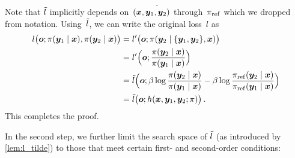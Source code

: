 \begin{proofEnd}
\begin{proofEnd}
\begin{equation*}
            \,.
        \end{equation*}
        Note that ${\tilde{l}}$ implicitly depends on~$({\bm{x}}, {\bm{y}}_1, {\bm{y}}_2)$ through~$\pi_{\rm ref}$ which we dropped from notation. Using~${\tilde{l}}$, we can write the original loss~$l$ as
        \begin{align*}
            l\big({\bm{o}}; \pi({\bm{y}}_1 \mid {\bm{x}}), \pi({\bm{y}}_2 \mid {\bm{x}})\big) &= 
            l'\big({\bm{o}}; \pi({\bm{y}}_2 \mid \{{\bm{y}}_1, {\bm{y}}_2\}, {\bm{x}})\big) \\
            &= l'\Big({\bm{o}}; \frac{\pi({\bm{y}}_2 \mid {\bm{x}})}{\pi({\bm{y}}_1 \mid {\bm{x}})}\Big) \\
            &= {\tilde{l}}\Big({\bm{o}}; \beta \log \frac{\pi({\bm{y}}_2 \mid {\bm{x}})}{\pi({\bm{y}}_1 \mid {\bm{x}})} - \beta \log \frac{\pi_{\rm ref}({\bm{y}}_2 \mid {\bm{x}})}{\pi_{\rm ref}({\bm{y}}_1 \mid {\bm{x}})} \Big) \\
            &= {\tilde{l}}\big({\bm{o}}; h({\bm{x}}, {\bm{y}}_1, {\bm{y}}_2; \pi)\big)
            \,.
        \end{align*}
        This completes the proof.
    \end{proofEnd}
    
    In the second step, we further limit the search space of ${\tilde{l}}$ (as introduced by \cref{lem:l_tilde}) to those that meet certain first- and second-order conditions:
    

\end{proofEnd}
